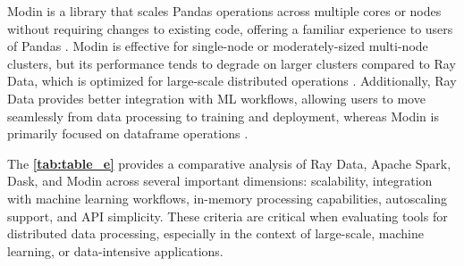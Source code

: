 Modin is a library that scales Pandas operations across multiple cores or nodes without requiring changes to existing code, offering a familiar experience to users of Pandas \cite{modin_2023}. Modin is effective for single-node or moderately-sized multi-node clusters, but its performance tends to degrade on larger clusters compared to Ray Data, which is optimized for large-scale distributed operations \cite{modin_2023}. Additionally, Ray Data provides better integration with ML workflows, allowing users to move seamlessly from data processing to training and deployment, whereas Modin is primarily focused on dataframe operations \cite{intel_modin}.

The \textbf{\autoref{tab:table_e}} provides a comparative analysis of Ray Data, Apache Spark, Dask, and Modin across several important dimensions: scalability, integration with machine learning workflows, in-memory processing capabilities, autoscaling support, and API simplicity. These criteria are critical when evaluating tools for distributed data processing, especially in the context of large-scale, machine learning, or data-intensive applications.

